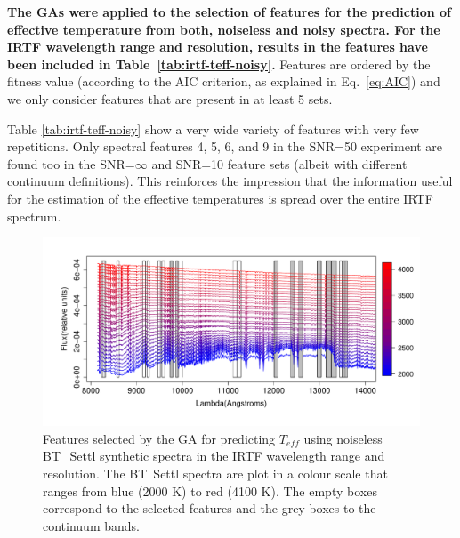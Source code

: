\textbf{
The GAs were applied to the selection of features for the
prediction of effective temperature from both, noiseless and noisy spectra.
For the IRTF wavelength range and resolution, results in the features have been included
in Table~\ref{tab:irtf-teff-noisy}. 
}
Features are ordered by the
fitness value (according to the AIC criterion, as explained in Eq.~\ref{eq:AIC}) and 
we only consider features that are present in at least 5 sets.


Table %
\ref{tab:irtf-teff-noisy}
show a very wide variety of features with very few repetitions. Only
spectral features 4, 5, 6, and 9 in the SNR=50 experiment are found
too in the SNR=$\infty$ and SNR=10 feature sets (albeit with different
continuum definitions). This reinforces the impression that the
information useful for the estimation of the effective temperatures is
spread over the entire IRTF spectrum.

\begin{figure}
\includegraphics[width=\textwidth]{figs/BT-spectraAtIRTF-Inf-teff2}
 \caption{Features selected by the GA for predicting $T_{eff}$ using
    noiseless BT\_Settl synthetic spectra in the IRTF wavelength range
    and resolution. The BT\ Settl spectra are plot in a colour scale
    that ranges from blue (2000 K) to red (4100 K). The empty boxes
    correspond to the selected features and the grey boxes to the
    continuum bands.}  \label{fig:IRTF-teff}
\end{figure}

